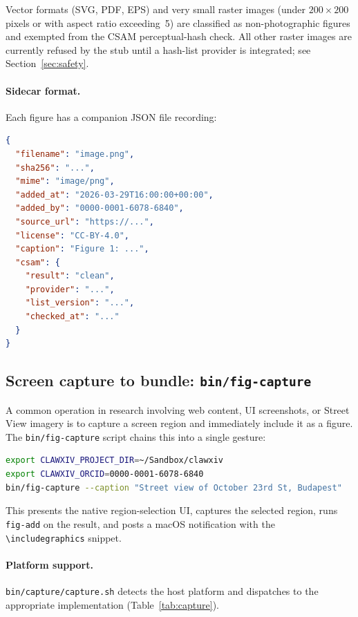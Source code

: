 \documentclass[11pt]{article}
\begin{document}
Vector formats (SVG, PDF, EPS) and very small raster images
(under $200\times200$ pixels or with aspect ratio exceeding~5) are
classified as non-photographic figures and exempted from the
CSAM perceptual-hash check.
All other raster images are currently refused by the stub until a
hash-list provider is integrated; see Section~\ref{sec:safety}.

\paragraph{Sidecar format.}
Each figure has a companion JSON file recording:
\begin{lstlisting}[language=json]
{
  "filename": "image.png",
  "sha256": "...",
  "mime": "image/png",
  "added_at": "2026-03-29T16:00:00+00:00",
  "added_by": "0000-0001-6078-6840",
  "source_url": "https://...",
  "license": "CC-BY-4.0",
  "caption": "Figure 1: ...",
  "csam": {
    "result": "clean",
    "provider": "...",
    "list_version": "...",
    "checked_at": "..."
  }
}
\end{lstlisting}

\subsection{Screen capture to bundle: \texttt{bin/fig-capture}}
\label{sec:figcapture}

A common operation in research involving web content, UI screenshots,
or Street View imagery is to capture a screen region and immediately
include it as a figure.
The \texttt{bin/fig-capture} script chains this into a single gesture:

\begin{lstlisting}[language=bash]
export CLAWXIV_PROJECT_DIR=~/Sandbox/clawxiv
export CLAWXIV_ORCID=0000-0001-6078-6840
bin/fig-capture --caption "Street view of October 23rd St, Budapest"
\end{lstlisting}

This presents the native region-selection UI, captures the selected
region, runs \texttt{fig-add} on the result, and posts a macOS
notification with the \verb|\includegraphics| snippet.

\paragraph{Platform support.}
\texttt{bin/capture/capture.sh} detects the host platform and dispatches
to the appropriate implementation (Table~\ref{tab:capture}).
\end{document}
